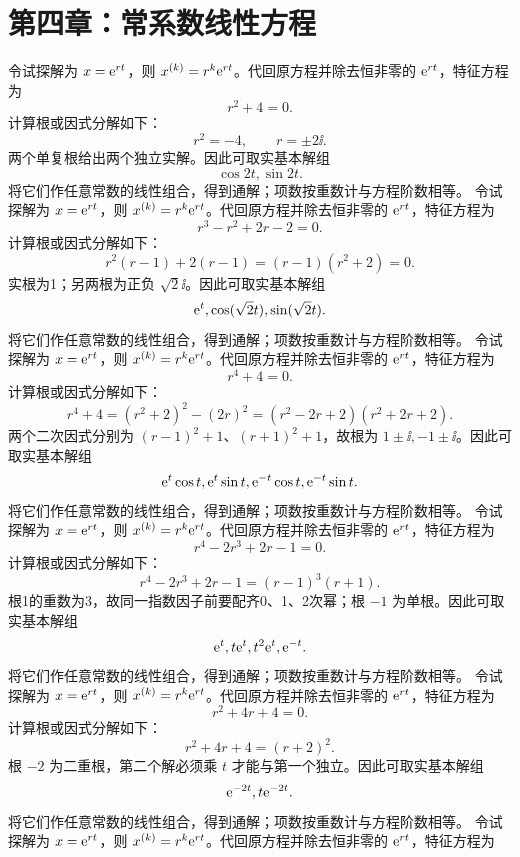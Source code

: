 \section{第四章：常系数线性方程}
令试探解为 $x=\mathrm e^{rt}$，则 $x^{(k)}=r^k\mathrm e^{rt}$。代回原方程并除去恒非零的 $\mathrm e^{rt}$，特征方程为
\[
r^2+4=0.
\]
计算根或因式分解如下：
\[
r^2=-4,\qquad r=\pm2\ii.
\]
两个单复根给出两个独立实解。因此可取实基本解组
\[
\cos2t,\sin2t.
\]
将它们作任意常数的线性组合，得到通解；项数按重数计与方程阶数相等。
令试探解为 $x=\mathrm e^{rt}$，则 $x^{(k)}=r^k\mathrm e^{rt}$。代回原方程并除去恒非零的 $\mathrm e^{rt}$，特征方程为
\[
r^3-r^2+2r-2=0.
\]
计算根或因式分解如下：
\[
r^2(r-1)+2(r-1)=(r-1)(r^2+2)=0.
\]
实根为1；另两根为正负 $\sqrt2\ii$。因此可取实基本解组
\[
\mathrm e^t,\cos(\sqrt2t),\sin(\sqrt2t).
\]
将它们作任意常数的线性组合，得到通解；项数按重数计与方程阶数相等。
令试探解为 $x=\mathrm e^{rt}$，则 $x^{(k)}=r^k\mathrm e^{rt}$。代回原方程并除去恒非零的 $\mathrm e^{rt}$，特征方程为
\[
r^4+4=0.
\]
计算根或因式分解如下：
\[
r^4+4=(r^2+2)^2-(2r)^2=(r^2-2r+2)(r^2+2r+2).
\]
两个二次因式分别为 $(r-1)^2+1$、$(r+1)^2+1$，故根为 $1\pm\ii,-1\pm\ii$。因此可取实基本解组
\[
\mathrm e^t\cos t,\mathrm e^t\sin t,\mathrm e^{-t}\cos t,\mathrm e^{-t}\sin t.
\]
将它们作任意常数的线性组合，得到通解；项数按重数计与方程阶数相等。
令试探解为 $x=\mathrm e^{rt}$，则 $x^{(k)}=r^k\mathrm e^{rt}$。代回原方程并除去恒非零的 $\mathrm e^{rt}$，特征方程为
\[
r^4-2r^3+2r-1=0.
\]
计算根或因式分解如下：
\[
r^4-2r^3+2r-1=(r-1)^3(r+1).
\]
根1的重数为3，故同一指数因子前要配齐0、1、2次幂；根 $-1$ 为单根。因此可取实基本解组
\[
\mathrm e^t,t\mathrm e^t,t^2\mathrm e^t,\mathrm e^{-t}.
\]
将它们作任意常数的线性组合，得到通解；项数按重数计与方程阶数相等。
令试探解为 $x=\mathrm e^{rt}$，则 $x^{(k)}=r^k\mathrm e^{rt}$。代回原方程并除去恒非零的 $\mathrm e^{rt}$，特征方程为
\[
r^2+4r+4=0.
\]
计算根或因式分解如下：
\[
r^2+4r+4=(r+2)^2.
\]
根 $-2$ 为二重根，第二个解必须乘 $t$ 才能与第一个独立。因此可取实基本解组
\[
\mathrm e^{-2t},t\mathrm e^{-2t}.
\]
将它们作任意常数的线性组合，得到通解；项数按重数计与方程阶数相等。
令试探解为 $x=\mathrm e^{rt}$，则 $x^{(k)}=r^k\mathrm e^{rt}$。代回原方程并除去恒非零的 $\mathrm e^{rt}$，特征方程为
